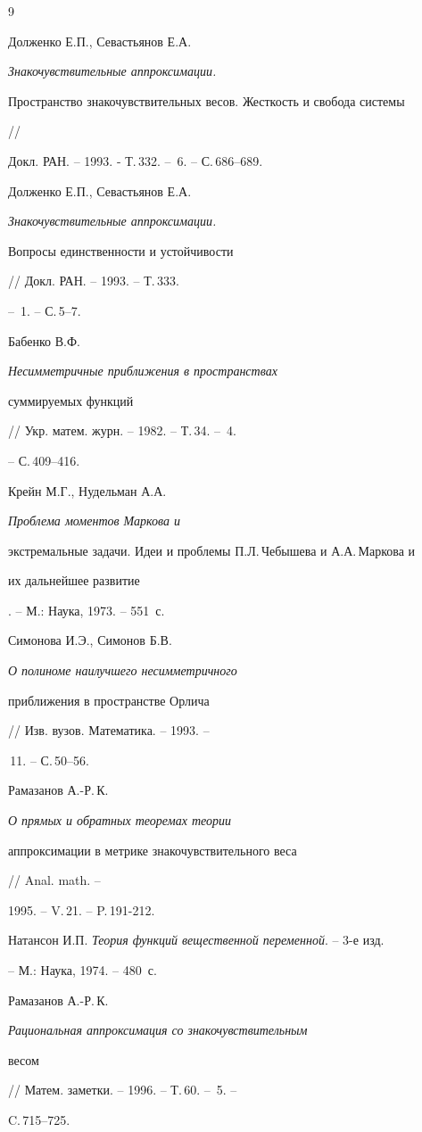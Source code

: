 \begin{thebibliography}{9}







Долженко Е.П., Севастьянов Е.А. {\em Знакочувствительные аппроксимации.


Пространство знакочувствительных весов. Жесткость и свобода системы} //


Докл. РАН. -- 1993. - Т.\,332. -- \No\,6. -- С.\,686--689.




Долженко Е.П., Севастьянов Е.А. {\em Знакочувствительные аппроксимации.


Вопросы единственности и устойчивости} // Докл. РАН. -- 1993. -- Т.\,333.


-- \No\,1. -- С.\,5--7.




Бабенко В.Ф. {\em Несимметричные приближения в пространствах


суммируемых функций} // Укр. матем. журн. -- 1982. -- Т.\,34. -- \No\,4.


-- С.\,409--416.




Крейн М.Г., Нудельман А.А. {\em Проблема моментов Маркова и


экстремальные задачи. Идеи и проблемы П.Л.\,Чебышева и А.А.\,Маркова и


их дальнейшее развитие}. -- М.: Наука, 1973. -- 551~с.




Симонова И.Э., Симонов Б.В. {\em О полиноме наилучшего несимметричного


приближения в пространстве Орлича} // Изв. вузов. Математика. -- 1993. --


\No\,11. -- С.\,50--56.




Рамазанов А.-Р.\,К. {\em О прямых и обратных теоремах теории


аппроксимации в метрике знакочувствительного веса} // Anal. math. --


1995. -- V.\,21. -- P.\,191-212.




Натансон И.П. {\em Теория функций вещественной переменной}. -- 3-е изд.


-- М.: Наука, 1974. -- 480~с.




Рамазанов А.-Р.\,К. {\em Рациональная аппроксимация со знакочувствительным


весом} // Матем. заметки. -- 1996. -- Т.\,60. -- \No\,5. --


C.\,715--725.








\end{thebibliography}





